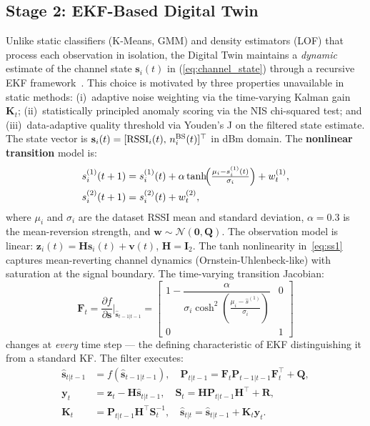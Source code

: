 \documentclass[conference]{IEEEtran}
\begin{document}
\subsection{Stage 2: EKF-Based Digital Twin}
\label{sec:dt}

Unlike static classifiers (K-Means, GMM) and density estimators (LOF)
that process each observation in isolation, the Digital Twin maintains
a \textit{dynamic} estimate of the channel state $\mathbf{s}_i(t)$ in
(\ref{eq:channel_state}) through a recursive EKF framework~\cite{ref_ekf}.
This choice is motivated by three properties unavailable in static methods:
(i)~adaptive noise weighting via the time-varying Kalman gain $\mathbf{K}_t$;
(ii)~statistically principled anomaly scoring via the NIS chi-squared test;
and (iii)~data-adaptive quality threshold via Youden's J on the filtered
state estimate. The state vector is $\mathbf{s}_i(t)=[\text{RSSI}_i(t),\,n^{\rm BS}_i(t)]^\top$
in dBm domain. The \textbf{nonlinear transition} model is:
\begin{align}
s^{(1)}_i(t+1) &= s^{(1)}_i(t)
  + \alpha\tanh\!\Bigl(\tfrac{\mu_i - s^{(1)}_i(t)}{\sigma_i}\Bigr)
  + w^{(1)}_t, \label{eq:ss1}\\
s^{(2)}_i(t+1) &= s^{(2)}_i(t) + w^{(2)}_t, \label{eq:ss2}
\end{align}
where $\mu_i$ and $\sigma_i$ are the dataset RSSI mean and standard
deviation, $\alpha{=}0.3$ is the mean-reversion strength,
and $\mathbf{w}\sim\mathcal{N}(\mathbf{0},\mathbf{Q})$.
The observation model is linear: $\mathbf{z}_i(t)=\mathbf{H}\mathbf{s}_i(t)+\mathbf{v}(t)$,
$\mathbf{H}=\mathbf{I}_2$. The tanh nonlinearity in~\eqref{eq:ss1}
captures mean-reverting channel dynamics (Ornstein-Uhlenbeck-like) with
saturation at the signal boundary. The time-varying transition Jacobian:
\begin{equation}
\mathbf{F}_t = \frac{\partial f}{\partial \mathbf{s}}\bigg|_{\hat{\mathbf{s}}_{t-1|t-1}}
= \begin{bmatrix}1 - \dfrac{\alpha}{\sigma_i\cosh^2\!\left(\frac{\mu_i - \hat{s}^{(1)}}{\sigma_i}\right)} & 0\\[6pt] 0 & 1\end{bmatrix}
\label{eq:F_jacobian}
\end{equation}
changes at \emph{every} time step — the defining characteristic of EKF
distinguishing it from a standard KF. The filter executes:
\begin{align}
\hat{\mathbf{s}}_{t|t-1} &= f(\hat{\mathbf{s}}_{t-1|t-1}),\quad
\mathbf{P}_{t|t-1}=\mathbf{F}_t\mathbf{P}_{t-1|t-1}\mathbf{F}_t^\top+\mathbf{Q},
\label{eq:pred}\\
\mathbf{y}_t &= \mathbf{z}_t-\mathbf{H}\hat{\mathbf{s}}_{t|t-1},\quad
\mathbf{S}_t=\mathbf{H}\mathbf{P}_{t|t-1}\mathbf{H}^\top+\mathbf{R},
\label{eq:innov}\\
\mathbf{K}_t &= \mathbf{P}_{t|t-1}\mathbf{H}^\top\mathbf{S}_t^{-1},\quad
\hat{\mathbf{s}}_{t|t}=\hat{\mathbf{s}}_{t|t-1}+\mathbf{K}_t\mathbf{y}_t.
\label{eq:update}
\end{align}
\end{document}
